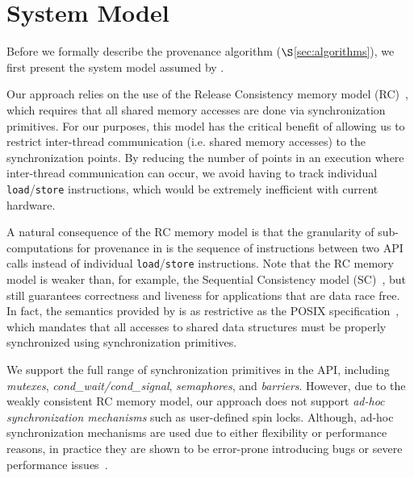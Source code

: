 \section{System Model}
\label{sec:model}

Before we formally describe the provenance algorithm ($\S$\ref{sec:algorithms}),  we first present the system model assumed by \projecttitle.%

 Our approach relies on the use of the
Release Consistency memory model (RC)~\cite{DSM-RC}, which requires that all shared memory accesses are done via synchronization primitives.
For our purposes, this model has the critical
benefit of allowing us to restrict inter-thread communication (i.e. shared
memory accesses) to the synchronization points. By reducing the number of 
points in an execution where inter-thread communication can occur, we avoid
having to track individual {\tt load}/{\tt store} instructions, %
which would be extremely inefficient with current hardware. 

A natural consequence of the RC memory model is that the granularity of sub-computations for provenance in \projecttitle is the sequence of instructions between two \pthreads API calls instead of  individual {\tt load}/{\tt store} instructions. Note that the RC memory model is weaker
than, for example, the Sequential Consistency model (SC)~\cite{scLamport}, but
still guarantees correctness and liveness for applications that are data race
free. In fact,  the semantics provided by
\projecttitle is as restrictive as the POSIX specification~\cite{pthreads-spec}, which mandates that all accesses to shared data structures must be properly synchronized using 
\pthreads synchronization primitives. 

 We support the full range of synchronization
primitives in the \pthreads API, including {\em mutexes}, {\em cond\_wait/cond\_signal}, {\em semaphores},  and {\em
barriers}. However, due to the weakly consistent RC memory model, our approach
does not support {\em ad-hoc synchronization mechanisms} such as user-defined spin locks. 
Although, ad-hoc synchronization mechanisms are used due to either flexibility
or performance reasons, in practice they are shown to be
error-prone introducing bugs or severe performance issues~\cite{adhoc-sync}.
%
